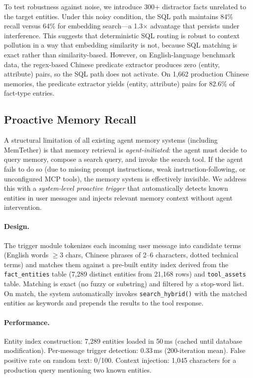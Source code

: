 \documentclass{article}
\begin{document}
To test robustness against noise, we introduce 300+ distractor facts unrelated to the target entities. Under this noisy condition, the SQL path maintains 84\% recall versus 64\% for embedding search---a 1.3$\times$ advantage that persists under interference. This suggests that deterministic SQL routing is robust to context pollution in a way that embedding similarity is not, because SQL matching is exact rather than similarity-based. However, on English-language benchmark data, the regex-based Chinese predicate extractor produces zero (entity, attribute) pairs, so the SQL path does not activate. On 1{,}662 production Chinese memories, the predicate extractor yields (entity, attribute) pairs for 82.6\% of fact-type entries.



\subsection{Proactive Memory Recall}
\label{sec:pmr}

A structural limitation of all existing agent memory systems (including MemTether) is that memory retrieval is \emph{agent-initiated}: the agent must decide to query memory, compose a search query, and invoke the search tool. If the agent fails to do so (due to missing prompt instructions, weak instruction-following, or unconfigured MCP tools), the memory system is effectively invisible. We address this with a \emph{system-level proactive trigger} that automatically detects known entities in user messages and injects relevant memory context without agent intervention.

\paragraph{Design.}
The trigger module tokenizes each incoming user message into candidate terms (English words $\geq 3$ chars, Chinese phrases of 2--6 characters, dotted technical terms) and matches them against a pre-built entity index derived from the \texttt{fact\_entities} table (7{,}289 distinct entities from 21{,}168 rows) and \texttt{tool\_assets} table. Matching is exact (no fuzzy or substring) and filtered by a stop-word list. On match, the system automatically invokes \texttt{search\_hybrid()} with the matched entities as keywords and prepends the results to the tool response.

\paragraph{Performance.}
Entity index construction: 7{,}289 entities loaded in 50\,ms (cached until database modification). Per-message trigger detection: 0.33\,ms (200-iteration mean). False positive rate on random text: 0/100. Context injection: 1{,}045 characters for a production query mentioning two known entities.
\end{document}
